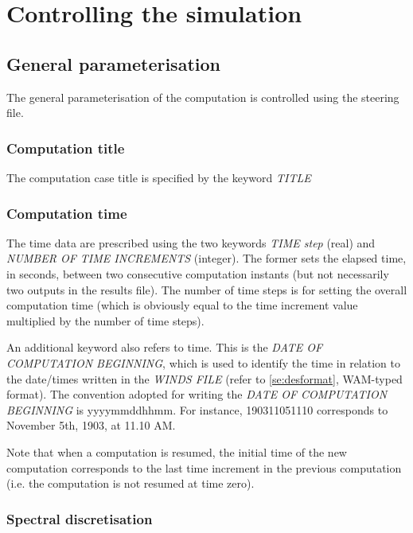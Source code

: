 \chapter{ Controlling the simulation }


\section{ General parameterisation }

 The general parameterisation of the computation is controlled using the steering file.


\subsection{ Computation title}

The computation case title is specified by the keyword \textit{TITLE}


\subsection{ Computation time}

 The time data are prescribed using the two keywords \textit{TIME step} (real) and \textit{NUMBER OF TIME INCREMENTS }(integer). The former sets the elapsed time, in seconds, between two consecutive computation instants (but not necessarily two outputs in the results file). The number of time steps is for setting the overall computation time (which is obviously equal to the time increment value multiplied by the number of time steps).

 An additional keyword also refers to time. This is the \textit{DATE OF COMPUTATION BEGINNING}, which is used to identify the time in relation to the date/times written in the \textit{WINDS FILE} (refer to \ref{se:desformat}, WAM-typed format). The convention adopted for writing the \textit{DATE OF COMPUTATION BEGINNING} is yyyymmddhhmm. For instance, 190311051110 corresponds to November 5th, 1903, at 11.10 AM.

 Note that when a computation is resumed, the initial time of the new computation corresponds to the last time increment in the previous computation (i.e. the computation is not resumed at time zero).


\subsection{ Spectral discretisation}

